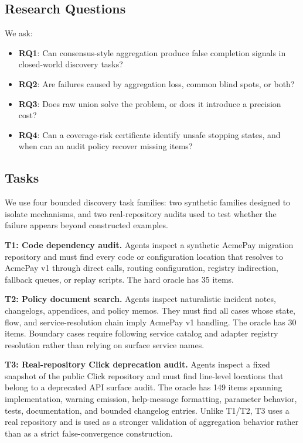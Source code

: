 \documentclass[letterpaper]{article}
\begin{document}
\subsection{Research Questions}

We ask:

\begin{itemize}
    \item \textbf{RQ1}: Can consensus-style aggregation produce false completion
    signals in closed-world discovery tasks?
    \item \textbf{RQ2}: Are failures caused by aggregation loss, common blind
    spots, or both?
    \item \textbf{RQ3}: Does raw union solve the problem, or does it introduce a
    precision cost?
    \item \textbf{RQ4}: Can a coverage-risk certificate identify unsafe
    stopping states, and when can an audit policy recover missing items?
\end{itemize}

\subsection{Tasks}

We use four bounded discovery task families: two synthetic families designed to
isolate mechanisms, and two real-repository audits used to test whether the
failure appears beyond constructed examples.

\textbf{T1: Code dependency audit.} Agents inspect a synthetic AcmePay migration
repository and must find every code or configuration location that resolves to
AcmePay v1 through direct calls, routing configuration, registry indirection,
fallback queues, or replay scripts. The hard oracle has 35 items.

\textbf{T2: Policy document search.} Agents inspect naturalistic incident notes,
changelogs, appendices, and policy memos. They must find all cases whose state,
flow, and service-resolution chain imply AcmePay v1 handling. The oracle has 30
items. Boundary cases require following service catalog and adapter registry
resolution rather than relying on surface service names.

\textbf{T3: Real-repository Click deprecation audit.} Agents inspect a fixed
snapshot of the public Click repository and must find line-level locations that
belong to a deprecated API surface audit. The oracle has 149 items spanning
implementation, warning emission, help-message formatting, parameter behavior,
tests, documentation, and bounded changelog entries. Unlike T1/T2, T3 uses a
real repository and is used as a stronger validation of aggregation behavior
rather than as a strict false-convergence construction.
\end{document}
